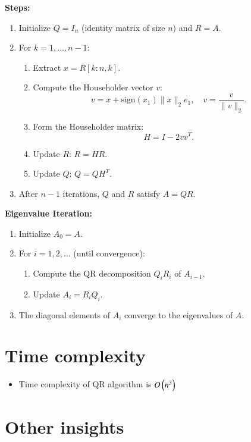 \documentclass[journal]{IEEEtran}
\begin{document}
\textbf{Steps:}
\begin{enumerate}
    \item Initialize \( Q = I_n \) (identity matrix of size \( n \)) and \( R = A \).
    \item For \( k = 1, \ldots, n-1 \):
    \begin{enumerate}
        \item Extract \( x = R[k:n, k] \).
        \item Compute the Householder vector \( v \):
        \[
        v = x + \text{sign}(x_1) \|x\|_2 e_1, \quad v = \frac{v}{\|v\|_2}.
        \]
        \item Form the Householder matrix:
        \[
        H = I - 2vv^T.
        \]
        \item Update \( R \): \( R = HR \).
        \item Update \( Q \): \( Q = QH^T \).
    \end{enumerate}
    \item After \( n-1 \) iterations, \( Q \) and \( R \) satisfy \( A = QR \).
\end{enumerate}

\textbf{Eigenvalue Iteration:}
\begin{enumerate}
    \item Initialize \( A_0 = A \).
    \item For \( i = 1, 2, \ldots \) (until convergence):
    \begin{enumerate}
        \item Compute the QR decomposition \( Q_iR_i \) of \( A_{i-1} \).
        \item Update \( A_i = R_iQ_i \).
    \end{enumerate}
    \item The diagonal elements of \( A_i \) converge to the eigenvalues of \( A \).
\end{enumerate}
\section{Time complexity}

\begin{itemize}
    \item Time complexity of QR algorithm is $O\left(n^3\right)$\\
\end{itemize}

\section{Other insights}
\end{document}
